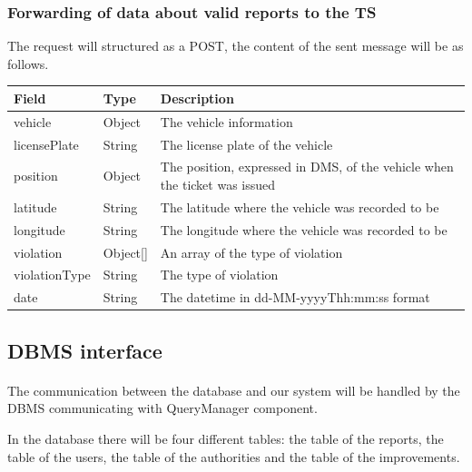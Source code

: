 					\subsubsection{Forwarding of data about valid reports to the TS}
						The request will structured as a POST, the content of the sent message will be as follows.
						\begin{table}[!h]
						\begin{tabular}{L{0.23\textwidth}L{0.15\textwidth}L{0.42\textwidth}}
							\toprule
							\textbf{Field} & \textbf{Type} & \textbf{Description} \\
							\midrule
							vehicle & Object & The vehicle information \\
							\hspace{2.5mm}licensePlate & String & The license plate of the vehicle \\
							position & Object & The position, expressed in DMS, of the vehicle when the ticket was issued  \\
							\hspace{2.5mm}latitude & String & The latitude where the vehicle was recorded to be \\
							\hspace{2.5mm}longitude & String & The longitude where the vehicle was recorded to be \\
							violation & Object[] & An array of the type of violation \\
							\hspace{2.5mm}violationType & String & The type of violation \\
							date & String & The datetime in \newline dd-MM-yyyyThh:mm:ss format \\
								 	\bottomrule
								\end{tabular}
							\end{table}
			\clearpage
			\subsection{DBMS interface}
				\paragraph{}
					The communication between the database and our system will be handled by the DBMS communicating with QueryManager component. 
					
					In the database there will be four different tables: the table of the reports, the table of the users, the table of the authorities and the table of the improvements.
				
